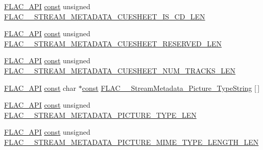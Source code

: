 \begin{DoxyCompactItemize}
\item 
\hyperlink{group__flac__export_ga56ca07df8a23310707732b1c0007d6f5}{F\+L\+A\+C\+\_\+\+A\+PI} \hyperlink{zconf_8h_a2c212835823e3c54a8ab6d95c652660e}{const} unsigned \hyperlink{group__flac__format_gacbd3c003cb8dd36e184b57257152cd16}{F\+L\+A\+C\+\_\+\+\_\+\+S\+T\+R\+E\+A\+M\+\_\+\+M\+E\+T\+A\+D\+A\+T\+A\+\_\+\+C\+U\+E\+S\+H\+E\+E\+T\+\_\+\+I\+S\+\_\+\+C\+D\+\_\+\+L\+EN}
\item 
\hyperlink{group__flac__export_ga56ca07df8a23310707732b1c0007d6f5}{F\+L\+A\+C\+\_\+\+A\+PI} \hyperlink{zconf_8h_a2c212835823e3c54a8ab6d95c652660e}{const} unsigned \hyperlink{group__flac__format_ga7f301f901b430c3acb334809f4641ded}{F\+L\+A\+C\+\_\+\+\_\+\+S\+T\+R\+E\+A\+M\+\_\+\+M\+E\+T\+A\+D\+A\+T\+A\+\_\+\+C\+U\+E\+S\+H\+E\+E\+T\+\_\+\+R\+E\+S\+E\+R\+V\+E\+D\+\_\+\+L\+EN}
\item 
\hyperlink{group__flac__export_ga56ca07df8a23310707732b1c0007d6f5}{F\+L\+A\+C\+\_\+\+A\+PI} \hyperlink{zconf_8h_a2c212835823e3c54a8ab6d95c652660e}{const} unsigned \hyperlink{group__flac__format_gac45ce3823397c3c2a5c56e86fc121e0f}{F\+L\+A\+C\+\_\+\+\_\+\+S\+T\+R\+E\+A\+M\+\_\+\+M\+E\+T\+A\+D\+A\+T\+A\+\_\+\+C\+U\+E\+S\+H\+E\+E\+T\+\_\+\+N\+U\+M\+\_\+\+T\+R\+A\+C\+K\+S\+\_\+\+L\+EN}
\item 
\hyperlink{group__flac__export_ga56ca07df8a23310707732b1c0007d6f5}{F\+L\+A\+C\+\_\+\+A\+PI} \hyperlink{zconf_8h_a2c212835823e3c54a8ab6d95c652660e}{const} char $\ast$\hyperlink{zconf_8h_a2c212835823e3c54a8ab6d95c652660e}{const} \hyperlink{group__flac__format_gaddee484e4ef594f23402072a950e00fd}{F\+L\+A\+C\+\_\+\+\_\+\+Stream\+Metadata\+\_\+\+Picture\+\_\+\+Type\+String} \mbox{[}$\,$\mbox{]}
\item 
\hyperlink{group__flac__export_ga56ca07df8a23310707732b1c0007d6f5}{F\+L\+A\+C\+\_\+\+A\+PI} \hyperlink{zconf_8h_a2c212835823e3c54a8ab6d95c652660e}{const} unsigned \hyperlink{group__flac__format_ga6afbd9c5fe1936bd73fd75768419414e}{F\+L\+A\+C\+\_\+\+\_\+\+S\+T\+R\+E\+A\+M\+\_\+\+M\+E\+T\+A\+D\+A\+T\+A\+\_\+\+P\+I\+C\+T\+U\+R\+E\+\_\+\+T\+Y\+P\+E\+\_\+\+L\+EN}
\item 
\hyperlink{group__flac__export_ga56ca07df8a23310707732b1c0007d6f5}{F\+L\+A\+C\+\_\+\+A\+PI} \hyperlink{zconf_8h_a2c212835823e3c54a8ab6d95c652660e}{const} unsigned \hyperlink{group__flac__format_gadcaf6e90f8457929c7fa447d19c2b214}{F\+L\+A\+C\+\_\+\+\_\+\+S\+T\+R\+E\+A\+M\+\_\+\+M\+E\+T\+A\+D\+A\+T\+A\+\_\+\+P\+I\+C\+T\+U\+R\+E\+\_\+\+M\+I\+M\+E\+\_\+\+T\+Y\+P\+E\+\_\+\+L\+E\+N\+G\+T\+H\+\_\+\+L\+EN}
\item 

\end{DoxyCompactItemize}
